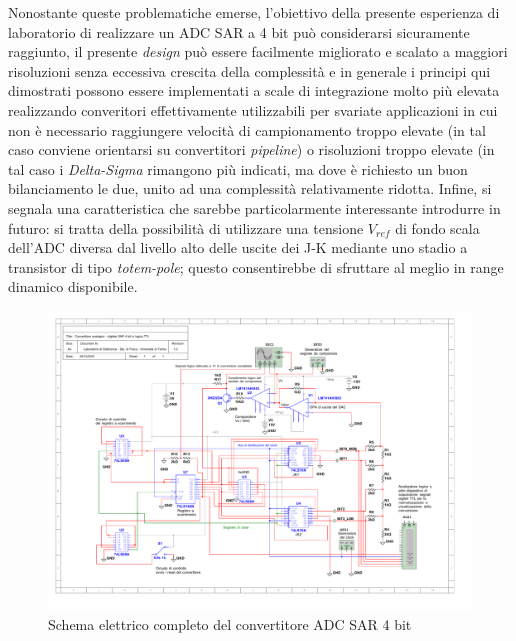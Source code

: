 \documentclass[journal]{IEEEtran}
\begin{document}
Nonostante queste problematiche emerse, l'obiettivo della presente esperienza di laboratorio di realizzare un ADC SAR a 4 bit può considerarsi sicuramente raggiunto, il presente \textit{design} può essere facilmente migliorato e scalato a maggiori risoluzioni senza eccessiva crescita della complessità e in generale i principi qui dimostrati possono essere implementati a scale di integrazione molto più elevata realizzando converitori effettivamente utilizzabili per svariate applicazioni in cui non è necessario raggiungere velocità di campionamento troppo elevate (in tal caso conviene orientarsi su convertitori \textit{pipeline}) o risoluzioni troppo elevate (in tal caso i \textit{Delta-Sigma} rimangono più indicati, ma dove è richiesto un buon bilanciamento le due, unito ad una complessità relativamente ridotta. Infine, si segnala una caratteristica che sarebbe particolarmente interessante introdurre in futuro: si tratta della possibilità di utilizzare una tensione $V_{ref}$ di fondo scala dell'ADC diversa dal livello alto delle uscite dei J-K mediante uno stadio a transistor di tipo \textit{totem-pole}; questo consentirebbe di sfruttare al meglio in range dinamico disponibile.
\\


\begin{figure}[t]%
\centering
\begin{center}
\includegraphics[trim = {0 0 50 0}, width=1.40\textwidth, angle=90]{sch-simulations/digital/output/Schema_convertitore_completo.pdf}
\end{center}
\caption{Schema elettrico completo del convertitore ADC SAR 4 bit}
\label{fig:circuit_sarCompleteSchematic}
\end{figure}
\end{document}
